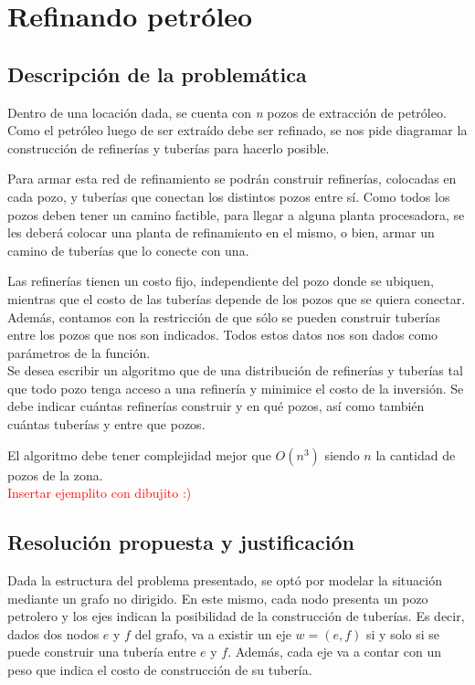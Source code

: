 \section{Refinando petr\'oleo}
\subsection{Descripci\'on de la problem\'atica}

Dentro de una locaci\'on dada, se cuenta con \emph{n} pozos de extracci\'on de petr\'oleo. Como el petr\'oleo luego de ser extra\'ido debe ser refinado, se nos pide diagramar la construcci\'on de refiner\'ias y tuber\'ias para hacerlo posible.

Para armar esta red de refinamiento se podr\'an construir refiner\'ias, colocadas en cada pozo, y tuber\'ias que conectan los distintos pozos entre s\'i. Como todos los pozos deben tener un camino factible, para llegar a alguna planta procesadora, se les deber\'a colocar una planta de refinamiento en el mismo, o bien, armar un camino de tuber\'ias que lo conecte con una.
 
	Las refiner\'ias tienen un costo fijo, independiente del pozo donde se ubiquen, mientras que el costo de las tuber\'ias depende de los pozos que se quiera conectar. Adem\'as, contamos con la restricci\'on de que s\'olo se pueden construir tuber\'ias entre los pozos que nos son indicados. Todos estos datos nos son dados como par\'ametros de la funci\'on.\\

	Se desea escribir un algoritmo que de una distribuci\'on de refiner\'ias y tuber\'ias tal que todo pozo tenga acceso a una refiner\'ia y minimice el costo de la inversi\'on. Se debe indicar cu\'antas refiner\'ias construir y en qu\'e pozos, as\'i como tambi\'en cu\'antas tuber\'ias y entre que pozos.

	El algoritmo debe tener complejidad mejor que $O(n^3)$ siendo $n$ la cantidad de pozos de la zona.\\
	
	\textcolor{red}{Insertar ejemplito con dibujito :)}

\newpage

\subsection{Resoluci\'on propuesta y justificaci\'on}

Dada la estructura del problema presentado, se opt\'o por modelar la situaci\'on mediante un grafo no dirigido. En este mismo, cada nodo presenta un pozo petrolero y los ejes indican la posibilidad de la construcci\'on de tuber\'ias. Es decir, dados dos nodos $e$ y $f$ del grafo, va a existir un eje $w=(e,f)$ si y solo si se puede construir una tuber\'ia entre $e$ y $f$. Adem\'as, cada eje va a contar con un peso que indica el costo de construcci\'on de su tuber\'ia.

